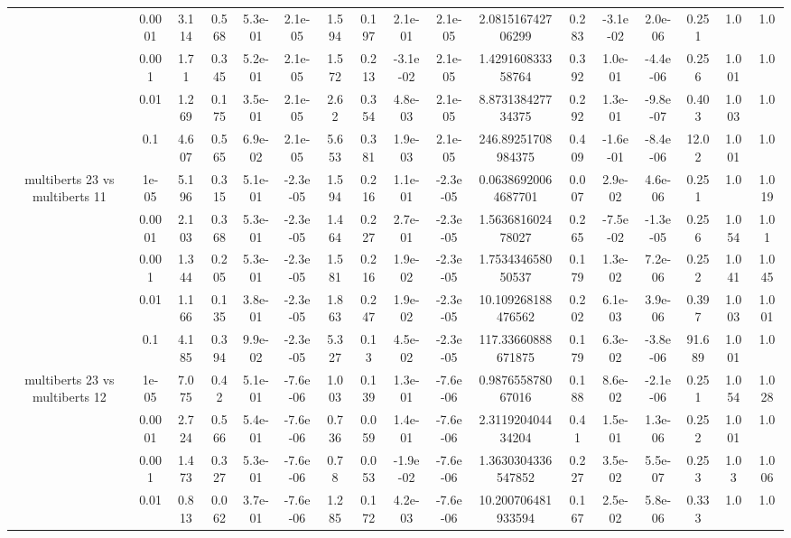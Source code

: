 \begin{tabular}{|c|c|c|c|c|c|c|c|c|c|c|c|c|c|c|c|c|}
 & 0.0001 & 3.114 & 0.568 & 5.3e-01 & 2.1e-05 & 1.594 & 0.197 & 2.1e-01 & 2.1e-05 & 2.081516742706299 & 0.283 & -3.1e-02 & 2.0e-06 & 0.251 & 1.0 & 1.0 \\
 & 0.001 & 1.71 & 0.345 & 5.2e-01 & 2.1e-05 & 1.572 & 0.213 & -3.1e-02 & 2.1e-05 & 1.429160833358764 & 0.392 & 1.0e-01 & -4.4e-06 & 0.256 & 1.001 & 1.0 \\
 & 0.01 & 1.269 & 0.175 & 3.5e-01 & 2.1e-05 & 2.62 & 0.354 & 4.8e-03 & 2.1e-05 & 8.873138427734375 & 0.292 & 1.3e-01 & -9.8e-07 & 0.403 & 1.003 & 1.0 \\
 & 0.1 & 4.607 & 0.565 & 6.9e-02 & 2.1e-05 & 5.653 & 0.381 & 1.9e-03 & 2.1e-05 & 246.89251708984375 & 0.409 & -1.6e-01 & -8.4e-06 & 12.02 & 1.001 & 1.0 \\
\hline
\multirow{5}{*}{multiberts 23 vs multiberts 11} & 1e-05 & 5.196 & 0.315 & 5.1e-01 & -2.3e-05 & 1.594 & 0.216 & 1.1e-01 & -2.3e-05 & 0.06386920064687701 & 0.007 & 2.9e-02 & 4.6e-06 & 0.251 & 1.0 & 1.019 \\
 & 0.0001 & 2.103 & 0.368 & 5.3e-01 & -2.3e-05 & 1.464 & 0.227 & 2.7e-01 & -2.3e-05 & 1.563681602478027 & 0.265 & -7.5e-02 & -1.3e-05 & 0.256 & 1.054 & 1.01 \\
 & 0.001 & 1.344 & 0.205 & 5.3e-01 & -2.3e-05 & 1.581 & 0.216 & 1.9e-02 & -2.3e-05 & 1.753434658050537 & 0.179 & 1.3e-02 & 7.2e-06 & 0.252 & 1.041 & 1.045 \\
 & 0.01 & 1.166 & 0.135 & 3.8e-01 & -2.3e-05 & 1.863 & 0.247 & 1.9e-02 & -2.3e-05 & 10.109268188476562 & 0.202 & 6.1e-03 & 3.9e-06 & 0.397 & 1.003 & 1.001 \\
 & 0.1 & 4.185 & 0.394 & 9.9e-02 & -2.3e-05 & 5.327 & 0.13 & 4.5e-02 & -2.3e-05 & 117.33660888671875 & 0.179 & 6.3e-02 & -3.8e-06 & 91.689 & 1.001 & 1.0 \\
\hline
\multirow{5}{*}{multiberts 23 vs multiberts 12} & 1e-05 & 7.075 & 0.42 & 5.1e-01 & -7.6e-06 & 1.003 & 0.139 & 1.3e-01 & -7.6e-06 & 0.987655878067016 & 0.188 & 8.6e-02 & -2.1e-06 & 0.251 & 1.054 & 1.028 \\
 & 0.0001 & 2.724 & 0.566 & 5.4e-01 & -7.6e-06 & 0.736 & 0.059 & 1.4e-01 & -7.6e-06 & 2.311920404434204 & 0.41 & 1.5e-01 & 1.3e-06 & 0.252 & 1.001 & 1.0 \\
 & 0.001 & 1.473 & 0.327 & 5.3e-01 & -7.6e-06 & 0.78 & 0.053 & -1.9e-02 & -7.6e-06 & 1.3630304336547852 & 0.227 & 3.5e-02 & 5.5e-07 & 0.253 & 1.03 & 1.006 \\
 & 0.01 & 0.813 & 0.062 & 3.7e-01 & -7.6e-06 & 1.285 & 0.172 & 4.2e-03 & -7.6e-06 & 10.200706481933594 & 0.167 & 2.5e-02 & 5.8e-06 & 0.333 & 1.0 & 1.0 \\

\end{tabular}

